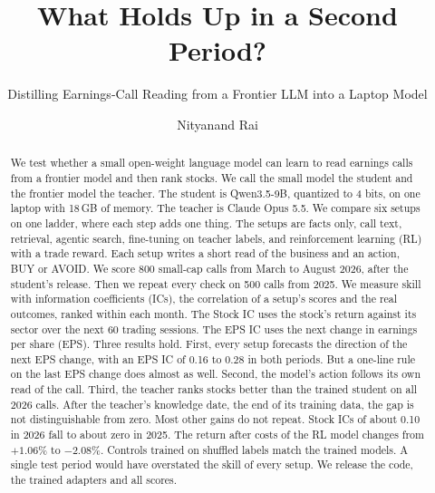 \documentclass[sigconf,nonacm]{acmart}
\begin{document}
\title{What Holds Up in a Second Period?}
\subtitle{Distilling Earnings-Call Reading from a Frontier LLM into a Laptop Model}

\author{Nityanand Rai}

\begin{abstract}
We test whether a small open-weight language model can learn to read earnings calls from a frontier model and then rank stocks.
We call the small model the student and the frontier model the teacher.
The student is Qwen3.5-9B, quantized to 4 bits, on one laptop with 18\,GB of memory.
The teacher is Claude Opus 5.5.
We compare six setups on one ladder, where each step adds one thing.
The setups are facts only, call text, retrieval, agentic search, fine-tuning on teacher labels, and reinforcement learning (RL) with a trade reward.
Each setup writes a short read of the business and an action, BUY or AVOID.
We score 800 small-cap calls from March to August 2026, after the student's release.
Then we repeat every check on 500 calls from 2025.
We measure skill with information coefficients (ICs), the correlation of a setup's scores and the real outcomes, ranked within each month.
The Stock IC uses the stock's return against its sector over the next 60 trading sessions.
The EPS IC uses the next change in earnings per share (EPS).
Three results hold.
First, every setup forecasts the direction of the next EPS change, with an EPS IC of 0.16 to 0.28 in both periods.
But a one-line rule on the last EPS change does almost as well.
Second, the model's action follows its own read of the call.
Third, the teacher ranks stocks better than the trained student on all 2026 calls.
After the teacher's knowledge date, the end of its training data, the gap is not distinguishable from zero.
Most other gains do not repeat.
Stock ICs of about 0.10 in 2026 fall to about zero in 2025.
The return after costs of the RL model changes from $+1.06\%$ to $-2.08\%$.
Controls trained on shuffled labels match the trained models.
A single test period would have overstated the skill of every setup.
We release the code, the trained adapters and all scores.
\end{abstract}


\maketitle
\end{document}
